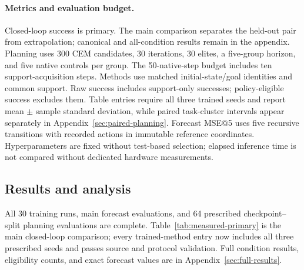 
\paragraph{Metrics and evaluation budget.}
Closed-loop success is primary. The main comparison separates the held-out
pair from extrapolation; canonical and all-condition results remain in the
appendix. Planning uses 300 CEM candidates, 30 iterations, 30 elites, a
five-group horizon, and five native controls per group. The 50-native-step
budget includes ten support-acquisition steps. Methods use matched
initial-state/goal identities and common support. Raw success includes
support-only successes; policy-eligible success excludes them. Table entries
require all three trained seeds and report mean $\pm$ sample standard
deviation, while paired task-cluster intervals appear separately in
Appendix~\ref{sec:paired-planning}. Forecast MSE@5 uses five recursive
transitions with recorded actions in immutable reference coordinates.
Hyperparameters are fixed without test-based selection; elapsed inference
time is not compared without dedicated hardware measurements.

\subsection{Results and analysis}
\label{sec:results}
All 30 training runs, main forecast evaluations, and 64 prescribed
checkpoint--split planning evaluations are complete.
Table~\ref{tab:measured-primary} is the main closed-loop comparison; every
trained-method entry now includes all three prescribed seeds and passes
source and protocol validation. Full
condition results, eligibility counts, and exact forecast values are in
Appendix~\ref{sec:full-results}.


